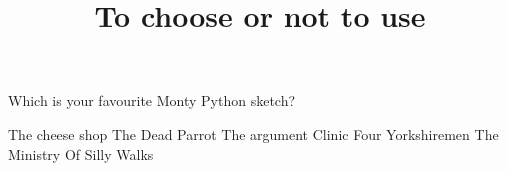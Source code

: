 \documentclass{webquiz}
\title{To choose or not to use}
\begin{document}
  \begin{question}     %
     Which is your favourite Monty Python sketch?
     \begin{choice}[columns=3]%
       \correct The cheese shop
       \correct The Dead Parrot
       \correct The argument Clinic
       \correct Four Yorkshiremen
       \correct The Ministry Of Silly Walks
     \end{choice}
  \end{question}
\end{document}
